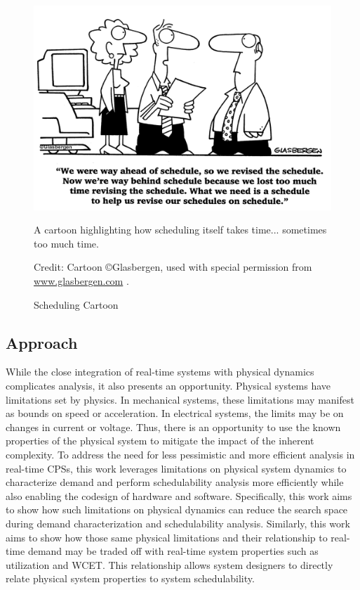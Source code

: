 \begin{figure}
    \centering
    \includegraphics[width=0.7\linewidth]{fig/515.jpg}
    \caption{Scheduling Cartoon} A cartoon highlighting how scheduling itself takes time... sometimes too much time.

    Credit: Cartoon \copyright Glasbergen, used with special permission from \url{www.glasbergen.com} \cite{glasbergen_todays_1998}.
    \label{fig:schedulingCartoon}
\end{figure}

\subsection{Approach}
While the close integration of real-time systems with physical dynamics complicates analysis, it also presents an opportunity.
Physical systems have limitations set by physics.
In mechanical systems, these limitations may manifest as bounds on speed or acceleration.
In electrical systems, the limits may be on changes in current or voltage.
Thus, there is an opportunity to use the known properties of the physical system to mitigate the impact of the inherent complexity.
To address the need for less pessimistic and more efficient analysis in real-time CPSs, this work leverages limitations on physical system dynamics to characterize demand and perform schedulability analysis more efficiently while also enabling the codesign of hardware and software.
Specifically, this work aims to show how such limitations on physical dynamics can reduce the search space during demand characterization and schedulability analysis.
Similarly, this work aims to show how those same physical limitations and their relationship to real-time demand may be traded off with real-time system properties such as utilization and WCET.
This relationship allows system designers to directly relate physical system properties to system schedulability.

